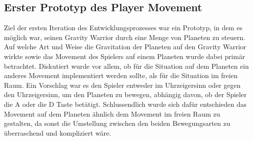 \documentclass[11pt]{scrartcl}
\begin{document}
\subsection{Erster Prototyp des Player Movement}
Ziel der ersten Iteration des Entwicklungsprozesses war ein Prototyp, in dem es möglich war, seinen Gravity Warrior durch eine Menge von Planeten zu steuern. Auf welche Art und Weise die Gravitation der Planeten auf den Gravity Warrior wirkte sowie das Movement des Spielers auf einem Planeten wurde dabei primär betrachtet. Diskutiert wurde vor allem, ob für die Situation auf dem Planeten ein anderes Movement implementiert werden sollte, als für die Situation im freien Raum. Ein Vorschlag war es den Spieler entweder im Uhrzeigersinn oder gegen den Uhrzeigersinn, um den Planeten zu bewegen, abhängig davon, ob der Spieler die A oder die D Taste betätigt. Schlussendlich wurde sich dafür entschieden das Movement auf dem Planeten ähnlich dem Movement im freien Raum zu gestalten, da sonst die Umstellung zwischen den beiden Bewegungsarten zu überraschend und kompliziert wäre.
\end{document}
